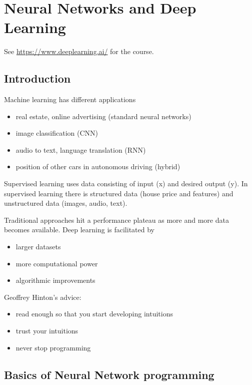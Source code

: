 \documentclass{article}
\begin{document}
\section{Neural Networks and Deep Learning}
See \url{https://www.deeplearning.ai/} for the course.
\subsection{Introduction}
Machine learning has different applications
\begin{itemize}
\item real estate, online advertising (standard neural networks)
\item image classification (CNN)
\item audio to text, language translation (RNN)
\item position of other cars in autonomous driving (hybrid)
\end{itemize}

Supervised learning uses data consisting of input (x) and desired output (y).
In supervised learning there is structured data (house price and features)
and unstructured data (images, audio, text).

Traditional approaches hit a performance plateau as more and more data becomes available.
Deep learning is facilitated by
\begin{itemize}
\item larger datasets
\item more computational power
\item algorithmic improvements
\end{itemize}

Geoffrey Hinton's advice:
\begin{itemize}
\item read enough so that you start developing intuitions
\item trust your intuitions
\item never stop programming
\end{itemize}

\subsection{Basics of Neural Network programming}
\end{document}
